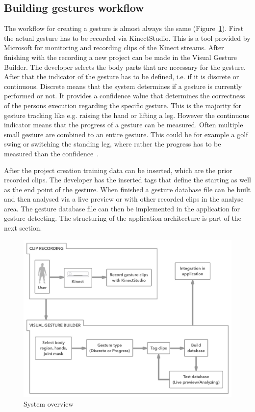 \subsection{Building gestures workflow}
The workflow for creating a gesture is almost always the same (Figure~\ref{fig:5_3_gestureCreation}). 
First the actual gesture has to be recorded via KinectStudio. This is a tool provided by Microsoft for monitoring and recording clips of the Kinect streams. After finishing with the recording a new project can be made in the Visual Gesture Builder. The developer selects the body parts that are necessary for the gesture. After that the indicator of the gesture has to be defined, i.e. if it is discrete or continuous. Discrete means that the system determines if a gesture is currently performed or not. It provides a confidence value that determines the correctness of the persons execution regarding the specific gesture. This is the majority for gesture tracking like e.g. raising the hand or lifting a leg. However the continuous indicator means that the progress of a gesture can be measured. Often multiple small gesture are combined to an entire gesture. This could be for example a golf swing or switching the standing leg, where rather the progress has to be measured than the confidence~\cite{MicrosoftVGB}.

After the project creation training data can be inserted, which are the prior recorded clips. The developer has the inserted tags that define the starting as well as the end point of the gesture. When finished a gesture database file can be built and then analysed via a live preview or with other recorded clips in the analyse area. The gesture database file can then be implemented in the application for gesture detecting. The structuring of the application architecture is part of the next section.
\begin{figure}[htb]
	\centering
	\begin{minipage}[t]{1\linewidth}
		\centering
		\includegraphics[width=1\linewidth]{Pictures/5_3_gestureCreation}
		\caption{System overview}
		\label{fig:5_3_gestureCreation}
	\end{minipage}
\end{figure}